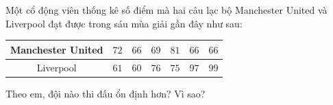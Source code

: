 \begin{ex}
Một cổ động viên thống kê số điểm mà hai câu lạc bộ Manchester United và Liverpool đạt được trong sáu mùa giải gần đây như sau:
\begin{center}
\begin{tabular}{|c|c|c|c|c|c|c|}\hline
Manchester United & $72$ & $66$ & $69$ & $81$ & $66$ & $66$\\\hline
Liverpool & $61$ & $60$ & $76$ & $75$ & $97$ & $99$\\\hline
\end{tabular}
\end{center}
Theo em, đội nào thi đấu ổn định hơn? Vì sao?
\end{ex}
